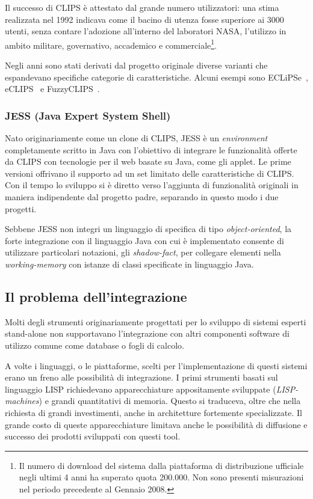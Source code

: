 Il successo di CLIPS è attestato dal grande numero utilizzatori: una stima realizzata nel 1992 indicava come il bacino di utenza fosse superiore ai 3000 utenti, senza contare l'adozione all'interno del laboratori NASA, l'utilizzo in ambito militare, governativo, accademico e commerciale\footnote{Il numero di download del sistema dalla piattaforma di distribuzione ufficiale negli ultimi 4 anni ha superato quota 200.000. Non sono presenti misurazioni nel periodo precedente al Gennaio 2008.}.~\cite{clipsarch1992}

Negli anni sono stati derivati dal progetto originale diverse varianti che espandevano specifiche categorie di caratteristiche. Alcuni esempi sono ECLiPSe~\cite{haley1991}, eCLIPS~\cite{eclips} e FuzzyCLIPS~\cite{fuzzyclips}.

\subsubsection[JESS]{JESS (Java Expert System Shell)}
Nato originariamente come un clone di CLIPS, JESS è un \emph{environment} completamente scritto in Java con l'obiettivo di integrare le funzionalità offerte da CLIPS con tecnologie per il web basate su Java, come gli applet. 
Le prime versioni offrivano il supporto ad un set limitato delle caratteristiche di CLIPS. Con il tempo lo sviluppo si è diretto verso l'aggiunta di funzionalità originali in maniera indipendente dal progetto padre, separando in questo modo i due progetti.~\cite{laerhoven1999}~\cite{jessfaq}~\cite{jessmanual}

Sebbene JESS non integri un linguaggio di specifica di tipo \emph{object-oriented}, la forte integrazione con il linguaggio Java con cui è implementato consente di utilizzare particolari notazioni, gli \emph{shadow-fact}, per collegare elementi nella \emph{working-memory} con istanze di classi specificate in linguaggio Java.


\subsection{Il problema dell'integrazione}

Molti degli strumenti originariamente progettati per lo sviluppo di sistemi esperti stand-alone non supportavano l'integrazione con altri componenti software di utilizzo comune come database o fogli di calcolo.

A volte i linguaggi, o le piattaforme, scelti per l'implementazione di questi sistemi erano un freno alle possibilità di integrazione. I primi strumenti basati sul linguaggio LISP richiedevano apparecchiature appositamente sviluppate (\emph{LISP-machines}) e grandi quantitativi di memoria. Questo si traduceva, oltre che nella richiesta di grandi investimenti, anche in architetture fortemente specializzate. Il grande costo di queste apparecchiature limitava anche le possibilità di diffusione e successo dei prodotti sviluppati con questi tool.~\cite{development1993}

